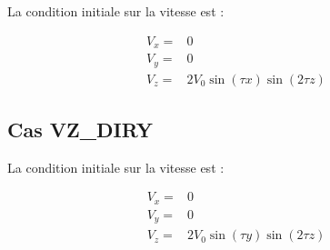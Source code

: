 La condition initiale sur la vitesse est :

\begin{align*}
V_x ={}& 0 \\
V_y ={}& 0 \\
V_z ={}& 2 V_0 \sin(\tau x) \sin(2 \tau z)
\end{align*}

\subsection{Cas VZ\_DIRY}

La condition initiale sur la vitesse est :

\begin{align*}
V_x ={}& 0 \\
V_y ={}& 0 \\
V_z ={}& 2 V_0 \sin(\tau y) \sin(2 \tau z)
\end{align*}

